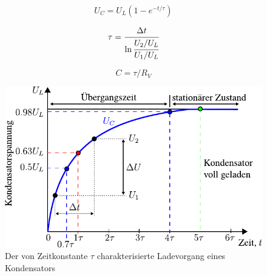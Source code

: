 \begin{minipage}[b]{0.3\textwidth}
    \begin{equation}
        U_C = U_L (1 - e ^ {-t/\tau})
        \label{eq:kondensator_e_funktion}
    \end{equation}
\end{minipage}
%
\begin{minipage}[b]{0.3\textwidth}
    \begin{equation}
        \tau = \cfrac{\Delta t}{\ln \cfrac{U_2 / U_L}{U_1 / U_L}}
        \label{eq:bestimmung_der_zeitkonstante}
    \end{equation}
\end{minipage}
%
\begin{minipage}[b]{0.3\textwidth}
    \begin{equation}
        C = \tau / R_V
        \label{eg:kondensator_zeitkonstate}
    \end{equation}
\end{minipage}

\begin{figure}[htb]
    \centering
    \includegraphics[]{./images/kondensator_ladevorgang.pdf}
    \caption{Der von Zeitkonstante $\tau$ charakterisierte Ladevorgang eines Kondensators}
    \label{fig:ladevorgang_eines_kondensators}
\end{figure}

